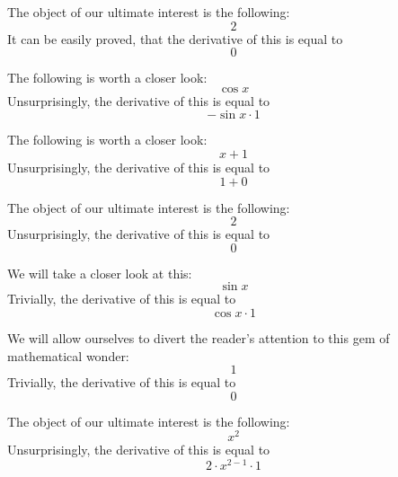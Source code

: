 \documentclass{article}
\begin{document}
The object of our ultimate interest is the following:
\begin{equation}
2 
\end{equation}
It can be easily proved, that the derivative of this is equal to
\begin{equation}
0 
\end{equation}

The following is worth a closer look:
\begin{equation}
\cos x 
\end{equation}
Unsurprisingly, the derivative of this is equal to
\begin{equation}
-\sin x \cdot 1 
\end{equation}

The following is worth a closer look:
\begin{equation}
x + 1 
\end{equation}
Unsurprisingly, the derivative of this is equal to
\begin{equation}
1 + 0 
\end{equation}

The object of our ultimate interest is the following:
\begin{equation}
2 
\end{equation}
Unsurprisingly, the derivative of this is equal to
\begin{equation}
0 
\end{equation}

We will take a closer look at this:
\begin{equation}
\sin x 
\end{equation}
Trivially, the derivative of this is equal to
\begin{equation}
\cos x \cdot 1 
\end{equation}

We will allow ourselves to divert the reader's attention to this gem of mathematical wonder:
\begin{equation}
1 
\end{equation}
Trivially, the derivative of this is equal to
\begin{equation}
0 
\end{equation}

The object of our ultimate interest is the following:
\begin{equation}
x ^{2 } 
\end{equation}
Unsurprisingly, the derivative of this is equal to
\begin{equation}
2 \cdot x ^{2 - 1 } \cdot 1 
\end{equation}
\end{document}
